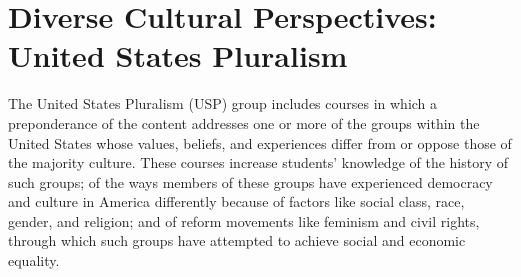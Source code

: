 \documentclass[
  letterpaper,
]{scrbook}
\begin{document}
\hypertarget{sec-diverse-cultural-perspectives-united-states}{%
\section{Diverse Cultural Perspectives: United States
Pluralism}\label{sec-diverse-cultural-perspectives-united-states}}

The United States Pluralism (USP) group includes courses in which a
preponderance of the content addresses one or more of the groups within
the United States whose values, beliefs, and experiences differ from or
oppose those of the majority culture. These courses increase students'
knowledge of the history of such groups; of the ways members of these
groups have experienced democracy and culture in America differently
because of factors like social class, race, gender, and religion; and of
reform movements like feminism and civil rights, through which such
groups have attempted to achieve social and economic equality.
\end{document}
